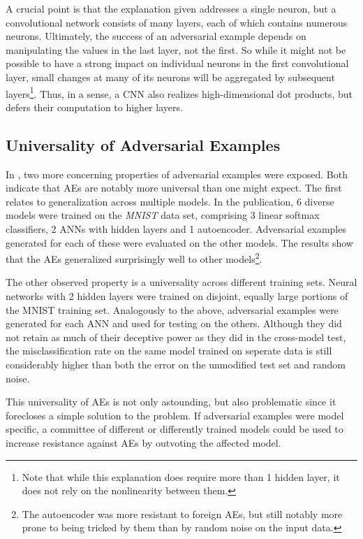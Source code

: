 \documentclass[11pt, a4paper]{article}
\begin{document}
A crucial point is that the explanation given addresses a single neuron, but a convolutional network consists of many layers, each of which contains numerous neurons. Ultimately, the success of an adversarial example depends on manipulating the values in the last layer, not the first. So while it might not be possible to have a strong impact on individual neurons in the first convolutional layer, small changes at many of its neurons will be aggregated by subsequent layers\footnote{Note that while this explanation does require more than 1 hidden layer, it does not rely on the nonlinearity between them.}. Thus, in a sense, a CNN also realizes high-dimensional dot products, but defers their computation to higher layers.

\subsection{Universality of Adversarial Examples}
In \cite{intriguing-properties-of-neural-networks}, two more concerning properties of adversarial examples were exposed. Both indicate that AEs are notably more universal than one might expect. The first relates to generalization across multiple models. In the publication, 6 diverse models were trained on the \emph{MNIST} data set, comprising 3 linear softmax classifiers, 2 ANNs with hidden layers and 1 autoencoder. Adversarial examples generated for each of these were evaluated on the other models. The results show that the AEs generalized surprisingly well to other models\footnote{The autoencoder was more resistant to foreign AEs, but still notably more prone to being tricked by them than by random noise on the input data.}.

The other observed property is a universality across different training sets. Neural networks with 2 hidden layers were trained on disjoint, equally large portions of the MNIST training set. Analogously to the above, adversarial examples were generated for each ANN and used for testing on the others. Although they did not retain as much of their deceptive power as they did in the cross-model test, the misclassification rate on the same model trained on seperate data is still considerably higher than both the error on the unmodified test set and random noise.

This universality of AEs is not only astounding, but also problematic since it forecloses a simple solution to the problem. If adversarial examples were model specific, a committee of different or differently trained models could be used to increase resistance against AEs by outvoting the affected model.
\end{document}
